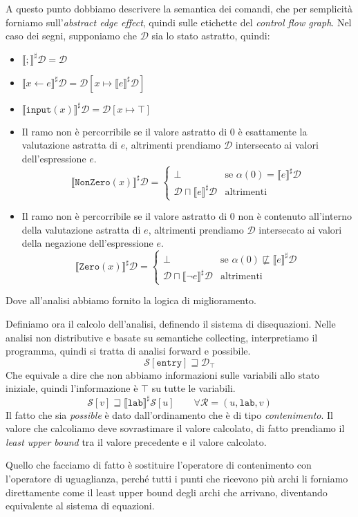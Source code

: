 A questo punto dobbiamo descrivere la semantica dei comandi, che per 
semplicità forniamo sull'\textit{abstract edge effect}, quindi sulle etichette 
del \textit{control flow graph}.
Nel caso dei segni, supponiamo che $\mathcal{D}$ sia lo stato astratto,
quindi:
\begin{itemize}
    \item $\llbracket ; \rrbracket^\sharp \mathcal{D} = \mathcal{D}$
    \item $\llbracket x \gets e \rrbracket^\sharp \mathcal{D} = 
    \mathcal{D}[x \mapsto \llbracket e \rrbracket^\sharp \mathcal{D}]$
    \item $\llbracket \texttt{input}(x) \rrbracket^\sharp \mathcal{D} =
    \mathcal{D}[x \mapsto \top]$
    \item Il ramo non è percorribile se il valore astratto di $0$ è 
    esattamente la valutazione astratta di $e$, altrimenti 
    prendiamo $\mathcal{D}$ intersecato ai valori dell'espressione 
    $e$.
    \[\llbracket \texttt{NonZero}(x) \rrbracket^\sharp \mathcal{D} =
    \begin{cases}
        \bot & \text{se } \alpha(0) = \llbracket e \rrbracket^\sharp \mathcal{D} \\
        \mathcal{D} \sqcap \llbracket e \rrbracket^\sharp \mathcal{D} & \text{altrimenti}
    \end{cases}
    \]
    \item Il ramo non è percorribile se il valore astratto di $0$ non 
    è contenuto all'interno della valutazione astratta di $e$, altrimenti 
    prendiamo $\mathcal{D}$ intersecato ai valori della negazione 
    dell'espressione $e$. 
    \[
      \llbracket \texttt{Zero}(x) \rrbracket^\sharp \mathcal{D} =
        \begin{cases}
            \bot & \text{se } \alpha(0) \not \sqsubseteq \llbracket e \rrbracket^\sharp \mathcal{D} \\
            \mathcal{D} \sqcap \llbracket \neg e \rrbracket^\sharp \mathcal{D} & \text{altrimenti}
        \end{cases}  
    \]
\end{itemize}
Dove all'analisi abbiamo fornito la logica di miglioramento.

Definiamo ora il calcolo dell'analisi, definendo il sistema di 
disequazioni. Nelle analisi non distributive e basate su semantiche 
collecting, interpretiamo il programma, quindi si tratta di analisi 
forward e possibile.
\[
  \mathcal{S}[\texttt{entry}] \sqsupseteq \mathcal{D}_\top  
\]
Che equivale a dire che non abbiamo informazioni sulle variabili 
allo stato iniziale, quindi l'informazione è $\top$ su tutte 
le variabili.
\[
  \mathcal{S}[v] \sqsupseteq 
  \llbracket \texttt{lab} \rrbracket^\sharp \mathcal{S}[u]
  \qquad \forall \mathcal{R} = (u, \texttt{lab}, v)
\]
Il fatto che sia \textit{possible} è dato dall'ordinamento che 
è di tipo \textit{contenimento}. Il valore che calcoliamo deve 
sovrastimare il valore calcolato, di fatto prendiamo il 
\textit{least upper bound} tra il valore precedente e 
il valore calcolato.

Quello che facciamo di fatto è sostituire l'operatore di contenimento 
con l'operatore di uguaglianza, perché tutti i punti che ricevono più 
archi li forniamo direttamente come il least upper bound degli archi
che arrivano, diventando equivalente al sistema di equazioni.